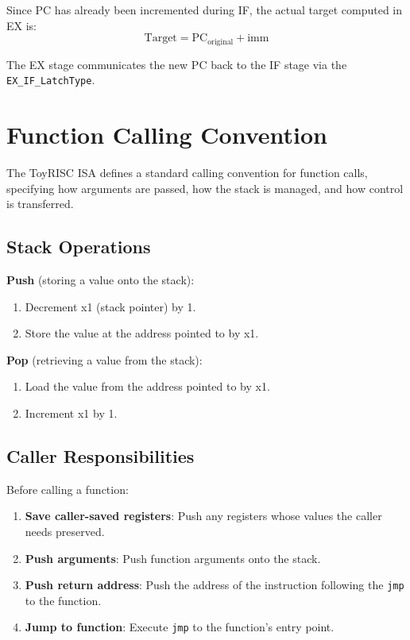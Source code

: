 \documentclass[12pt,a4paper]{article}
\begin{document}
Since PC has already been incremented during IF, the actual target computed in EX is:
\[
\text{Target} = \text{PC}_{\text{original}} + \text{imm}
\]

The EX stage communicates the new PC back to the IF stage via the \texttt{EX\_IF\_LatchType}.

\section{Function Calling Convention}

The ToyRISC ISA defines a standard calling convention for function calls, specifying how arguments are passed, how the stack is managed, and how control is transferred.

\subsection{Stack Operations}

\textbf{Push} (storing a value onto the stack):
\begin{enumerate}
    \item Decrement x1 (stack pointer) by 1.
    \item Store the value at the address pointed to by x1.
\end{enumerate}

\textbf{Pop} (retrieving a value from the stack):
\begin{enumerate}
    \item Load the value from the address pointed to by x1.
    \item Increment x1 by 1.
\end{enumerate}

\subsection{Caller Responsibilities}

Before calling a function:
\begin{enumerate}
    \item \textbf{Save caller-saved registers}: Push any registers whose values the caller needs preserved.
    \item \textbf{Push arguments}: Push function arguments onto the stack.
    \item \textbf{Push return address}: Push the address of the instruction following the \texttt{jmp} to the function.
    \item \textbf{Jump to function}: Execute \texttt{jmp} to the function's entry point.
\end{enumerate}
\end{document}
